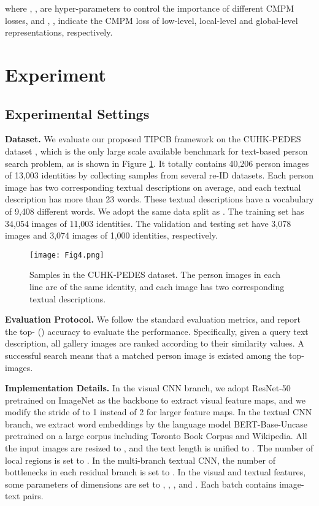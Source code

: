 \documentclass[review]{elsarticle}
\begin{document}
where , ,  are hyper-parameters to control the importance of different CMPM losses, and , ,  indicate the CMPM loss of low-level, local-level and global-level representations, respectively.

\section{Experiment}
\subsection{Experimental Settings}
\textbf{Dataset.} We evaluate our proposed TIPCB framework on the CUHK-PEDES dataset \cite{7}, which is the only large scale available benchmark for text-based person search problem, as is shown in Figure \ref{fig4}. It totally contains 40,206 person images of 13,003 identities by collecting samples from several re-ID datasets. Each person image has two corresponding textual descriptions on average, and each textual description has more than 23 words. These textual descriptions have a vocabulary of 9,408 different words. We adopt the same data split as \cite{7}. The training set has 34,054 images of 11,003 identities. The validation and testing set have 3,078 images and 3,074 images of 1,000 identities, respectively.

\begin{figure}[!t]
\centering
\texttt{[image: Fig4.png]}\\
\caption{Samples in the CUHK-PEDES dataset. The person images in each line are of the same identity, and each image has two corresponding textual descriptions.}
\label{fig4}
\end{figure}

\textbf{Evaluation Protocol.} We follow the standard evaluation metrics, and report the top- () accuracy to evaluate the performance. Specifically, given a query text description, all gallery images are ranked according to their similarity values. A successful search means that a matched person image is existed among the top- images.

\textbf{Implementation Details.} In the visual CNN branch, we adopt ResNet-50 pretrained on ImageNet \cite{51} as the backbone to extract visual feature maps, and we modify the stride of  to 1 instead of 2 for larger feature maps. In the textual CNN branch, we extract word embeddings by the language model BERT-Base-Uncase pretrained on a large corpus including Toronto Book Corpus and Wikipedia. All the input images are resized to , and the text length is unified to . The number of local regions is set to . In the multi-branch textual CNN, the number of bottlenecks in each residual branch is set to . In the visual and textual features, some parameters of dimensions are set to , , ,  and . Each batch contains  image-text pairs. 
\end{document}
